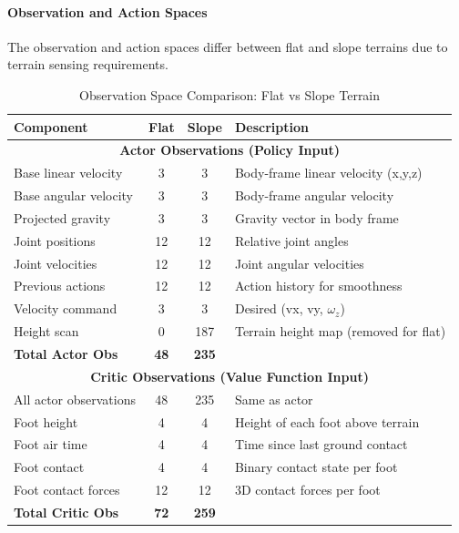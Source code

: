 \documentclass[12pt,a4paper]{article}
\begin{document}
\paragraph{Observation and Action Spaces}

The observation and action spaces differ between flat and slope terrains due to terrain sensing requirements.

\begin{table}[h]
\centering
\caption{Observation Space Comparison: Flat vs Slope Terrain}
\small
\begin{tabular}{|l|c|c|p{5cm}|}
\hline
\textbf{Component} & \textbf{Flat} & \textbf{Slope} & \textbf{Description} \\
\hline
\hline
\multicolumn{4}{|c|}{\textbf{Actor Observations (Policy Input)}} \\
\hline
Base linear velocity & 3 & 3 & Body-frame linear velocity (x,y,z) \\
Base angular velocity & 3 & 3 & Body-frame angular velocity \\
Projected gravity & 3 & 3 & Gravity vector in body frame \\
Joint positions & 12 & 12 & Relative joint angles \\
Joint velocities & 12 & 12 & Joint angular velocities \\
Previous actions & 12 & 12 & Action history for smoothness \\
Velocity command & 3 & 3 & Desired (vx, vy, $\omega_z$) \\
Height scan & 0 & 187 & Terrain height map (removed for flat) \\
\hline
\textbf{Total Actor Obs} & \textbf{48} & \textbf{235} & \\
\hline
\hline
\multicolumn{4}{|c|}{\textbf{Critic Observations (Value Function Input)}} \\
\hline
All actor observations & 48 & 235 & Same as actor \\
Foot height & 4 & 4 & Height of each foot above terrain \\
Foot air time & 4 & 4 & Time since last ground contact \\
Foot contact & 4 & 4 & Binary contact state per foot \\
Foot contact forces & 12 & 12 & 3D contact forces per foot \\
\hline
\textbf{Total Critic Obs} & \textbf{72} & \textbf{259} & \\
\hline
\end{tabular}
\end{table}
\end{document}
